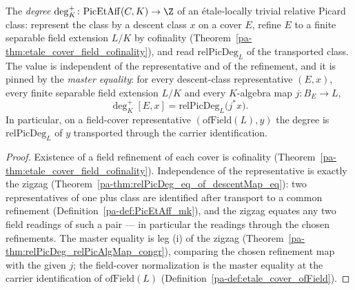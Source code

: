\begin{definition}
  \label{pa-def:degAff}
  \leanok

  The \emph{degree} \(\deg^{+}_K \colon \mathrm{PicEtAff}(C, K) \to \Z\) of an
  \'etale-locally trivial relative Picard class: represent the class by a descent class
  \(x\) on a cover \(E\), refine \(E\) to a finite separable field extension \(L/K\) by
  cofinality (Theorem~\ref{pa-thm:etale_cover_field_cofinality}), and read
  \(\mathrm{relPicDeg}_L\) of the transported class. The value is independent of the
  representative and of the refinement, and it is pinned by the \emph{master equality}: for
  every descent-class representative \((E, x)\), every finite separable field extension
  \(L/K\) and every \(K\)-algebra map \(j \colon B_E \to L\),
  \[
    \deg^{+}_K [E, x] = \mathrm{relPicDeg}_L\bigl(j^{*} x\bigr).
  \]
  In particular, on a field-cover representative \((\mathrm{ofField}(L), y)\) the degree is
  \(\mathrm{relPicDeg}_L\) of \(y\) transported through the carrier identification.
\end{definition}
\begin{proof}
  \leanok
  Existence of a field refinement of each cover is cofinality
  (Theorem~\ref{pa-thm:etale_cover_field_cofinality}). Independence of the representative is
  exactly the zigzag (Theorem~\ref{pa-thm:relPicDeg_eq_of_descentMap_eq}): two representatives
  of one plus class are identified after transport to a common refinement
  (Definition~\ref{pa-def:PicEtAff_mk}), and the zigzag equates any two field readings of such
  a pair — in particular the readings through the chosen refinements. The master equality is
  leg (i) of the zigzag (Theorem~\ref{pa-thm:relPicDeg_relPicAlgMap_congr}), comparing the
  chosen refinement map with the given \(j\); the field-cover normalization is the master
  equality at the carrier identification of \(\mathrm{ofField}(L)\)
  (Definition~\ref{pa-def:etale_cover_ofField}).
\end{proof}

